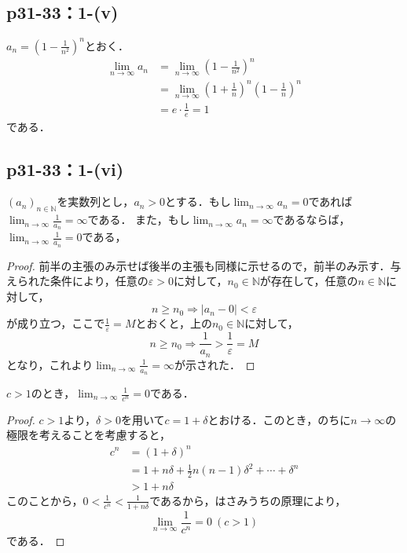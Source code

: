 \documentclass[uplatex,dvipdfmx,a4paper,10pt,fleqn]{jsarticle}
\begin{document}
\subsection*{p31-33：1-(v)}
\begin{tleftbar}
      $a_n =\left (1-\frac{1}{n^2}\right)^n$とおく．
      \begin{align*}
        \lim_{n \to \infty} a_n & =\lim_{n \to \infty} \left (1-\frac{1}{n^2}\right)^n \\
        & = \lim_{n \to \infty} \left (1+\frac{1}{n}\right)^n \left (1-\frac{1}{n}\right)^n \\
        & = e \cdot \frac{1}{e} =1
      \end{align*}
      である．
\end{tleftbar}

\subsection*{p31-33：1-(vi)}


    $(a_n)_{n \in \mathbb{N}}$を実数列とし，$a_n > 0$とする．もし$\lim_{n \to \infty} a_n =0$であれば$\lim_{n \to \infty} \frac{1}{a_n}=\infty$である．
    また，もし$\lim_{n \to \infty} a_n =\infty$であるならば，$\lim_{n \to \infty} \frac{1}{a_n} =0$である，



\begin{proof}
    前半の主張のみ示せば後半の主張も同様に示せるので，前半のみ示す．与えられた条件により，任意の$\varepsilon>0$に対して，$n_0 \in \mathbb{N}$が存在して，任意の$n \in \mathbb{N}$に対して，
    \[
        n \ge n_0 \Longrightarrow |a_n-0|<\varepsilon
    \]
    が成り立つ，ここで$\frac{1}{\varepsilon}=M$とおくと，上の$n_0 \in \mathbb{N}$に対して，
    \[
        n \ge n_0 \Longrightarrow \frac{1}{a_n} >\frac{1}{\varepsilon}=M
    \]
    となり，これより$\lim_{n \to \infty} \frac{1}{a_n}=\infty$が示された．
\end{proof}



    $c>1$のとき，$\lim_{n \to \infty} \frac{1}{c^n} = 0$である．

\begin{proof}
    $c>1$より，$\delta >0$を用いて$c=1+\delta$とおける．このとき，のちに$n \to \infty$の極限を考えることを考慮すると，
    \begin{align*}
        c^n &= (1+\delta)^n \\
        & = 1+n \delta +\frac{1}{2}n (n-1) \delta^2 + \cdots +\delta^n \\
        & > 1+n \delta
    \end{align*}
    このことから，$0<\frac{1}{c^n} <\frac{1}{1+n\delta}$であるから，はさみうちの原理により，
    \[
        \lim_{n \to \infty} \frac{1}{c^n} = 0~(c>1)
    \]
    である．
\end{proof}
\end{document}
